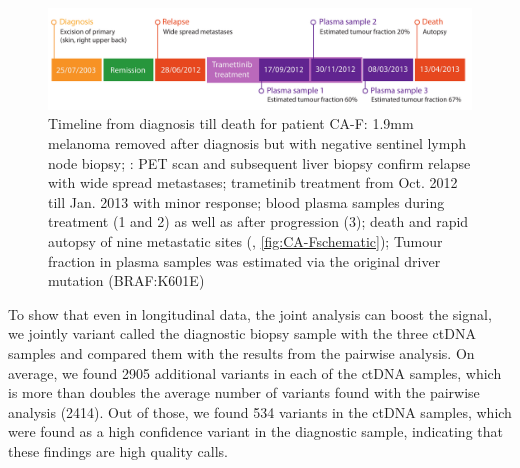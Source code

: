 \begin{figure}[!ht]
\centering
\includegraphics[width=.99\linewidth]{Figures/CA-F_timeline.pdf}
\caption[Timeline from diagnosis till death for patient CA-F]{Timeline from diagnosis till death for patient CA-F: 1.9mm melanoma removed after diagnosis \dateenglish{} but with negative sentinel lymph node biopsy; \dateenglish{}: PET scan and subsequent liver biopsy confirm relapse with wide spread metastases; trametinib treatment from Oct. 2012 till Jan. 2013 with minor response; blood plasma samples during treatment (1 and 2) as well as after progression (3); death and rapid autopsy of nine metastatic sites (\dateenglish{}, \protect\autoref{fig:CA-Fschematic}); Tumour fraction in plasma samples was estimated via the original driver mutation (BRAF:K601E)}\label{fig:CA-Ftimeline}
\end{figure}


To show that even in longitudinal data, the joint analysis can boost the signal, we jointly variant called the diagnostic biopsy sample with the three ctDNA samples and compared them with the results from the pairwise analysis. On average, we found 2905 additional variants in each of the ctDNA samples, which is more than doubles the average number of variants found with the pairwise analysis (2414). Out of those, we found 534 variants in the ctDNA samples, which were found as a high confidence variant in the diagnostic sample, indicating that these findings are high quality calls. 

